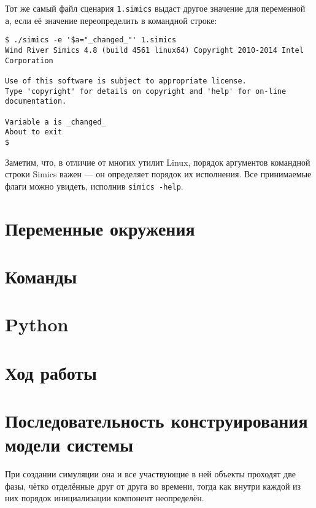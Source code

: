 \begin{enumerate*}
Тот же самый файл сценария \texttt{1.simics} выдаст другое значение для переменной \texttt{a}, если её значение переопределить в командной строке:

\begin{lstlisting}
$ ./simics -e '$a="_changed_"' 1.simics
Wind River Simics 4.8 (build 4561 linux64) Copyright 2010-2014 Intel Corporation

Use of this software is subject to appropriate license.
Type 'copyright' for details on copyright and 'help' for on-line documentation.

Variable a is _changed_
About to exit
$
\end{lstlisting}

Заметим, что, в отличие от многих утилит Linux, порядок аргументов командной строки Simics важен --- он определяет порядок их исполнения. Все принимаемые флаги можно увидеть, исполнив \texttt{simics -help}.
\end{enumerate*}

\section{Переменные окружения}

\section{Команды}

\section{Python}

\section{Ход работы}

\todo 


\section{Последовательность конструирования модели системы}

При создании симуляции она и все участвующие в ней объекты проходят две фазы, чётко отделённые друг от друга во времени, тогда как внутри каждой из них порядок инициализации компонент неопределён.

